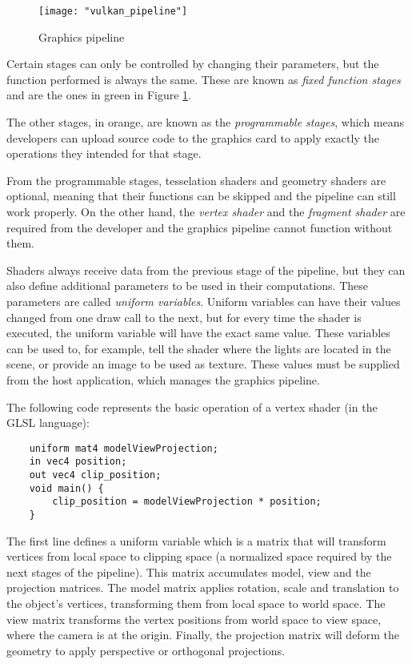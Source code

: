 \begin{figure}[h]
    \caption{Graphics pipeline}
    \begin{center}
        \texttt{[image: "vulkan\_pipeline"]}
    \end{center}
    \label{fig:graphics_pipeline}
\end{figure}

Certain stages can only be controlled by changing their parameters, but the function performed is always the same. These are known as \textit{fixed function stages} and are the ones in green in Figure \ref{fig:graphics_pipeline}.

The other stages, in orange, are known as the \textit{programmable stages}, which means developers can upload source code to the graphics card to apply exactly the operations they intended for that stage.

From the programmable stages, tesselation shaders and geometry shaders are optional, meaning that their functions can be skipped and the pipeline can still work properly. On the other hand, the \textit{vertex shader} and the \textit{fragment shader} are required from the developer and the graphics pipeline cannot function without them.

Shaders always receive data from the previous stage of the pipeline, but they can also define additional parameters to be used in their computations. These parameters are called \textit{uniform variables}. Uniform variables can have their values changed from one draw call to the next, but for every time the shader is executed, the uniform variable will have the exact same value. These variables can be used to, for example, tell the shader where the lights are located in the scene, or provide an image to be used as texture. These values must be supplied from the host application, which manages the graphics pipeline.

The following code represents the basic operation of a vertex shader (in the GLSL language):

\begin{verbatim}
    uniform mat4 modelViewProjection;
    in vec4 position;
    out vec4 clip_position;
    void main() {
        clip_position = modelViewProjection * position;
    }
\end{verbatim}

The first line defines a uniform variable which is a matrix that will transform vertices from local space to clipping space (a normalized space required by the next stages of the pipeline). This matrix accumulates model, view and the projection matrices. The model matrix applies rotation, scale and translation to the object's vertices, transforming them from local space to world space. The view matrix transforms the vertex positions from world space to view space, where the camera is at the origin. Finally, the projection matrix will deform the geometry to apply perspective or orthogonal projections.

